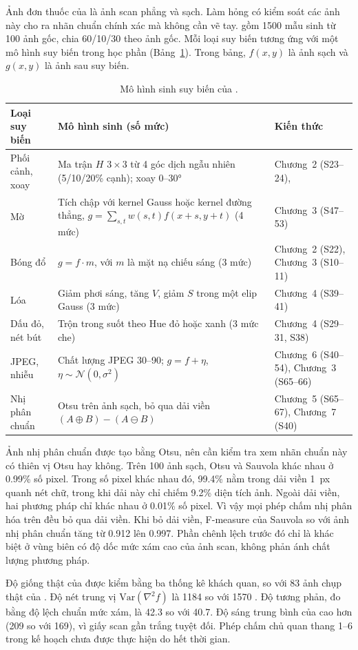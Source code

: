 Ảnh đơn thuốc của  là ảnh scan phẳng và sạch.
Làm hỏng có kiểm soát các ảnh này cho ra nhãn chuẩn chính xác mà không cần vẽ tay.
 gồm \num{1500} mẫu sinh từ 100 ảnh gốc, chia 60/10/30 theo ảnh gốc.
Mỗi loại suy biến tương ứng với một mô hình suy biến trong học phần (Bảng~\ref{tab:bo5}).
Trong bảng, $f(x,y)$ là ảnh sạch và $g(x,y)$ là ảnh sau suy biến.

\begin{table}[H]
\centering
\caption{Mô hình sinh suy biến của .}\label{tab:bo5}
\small
\begin{tabularx}{\linewidth}{lXl}
\toprule
\textbf{Loại suy biến} & \textbf{Mô hình sinh (số mức)} & \textbf{Kiến thức} \\
\midrule
Phối cảnh, xoay & Ma trận $H$ $3\times3$ từ 4 góc dịch ngẫu nhiên (5/10/20\% cạnh); xoay 0--30° & Chương~2 (S23--24), \cite{gonzalez2018dip} \\
Mờ & Tích chập với kernel Gauss hoặc kernel đường thẳng, $g=\sum_{s,t} w(s,t)f(x{+}s,y{+}t)$ (4 mức) & Chương~3 (S47--53) \\
Bóng đổ & $g=f\cdot m$, với $m$ là mặt nạ chiếu sáng (3 mức) & Chương~2 (S22), Chương~3 (S10--11) \\
Lóa & Giảm phơi sáng, tăng $V$, giảm $S$ trong một elip Gauss (3 mức) & Chương~4 (S39--41) \\
Dấu đỏ, nét bút & Trộn trong suốt theo Hue đỏ hoặc xanh (3 mức che) & Chương~4 (S29--31, S38) \\
JPEG, nhiễu & Chất lượng JPEG 30--90; $g=f+\eta$, $\eta\sim\mathcal N(0,\sigma^2)$ & Chương~6 (S40--54), Chương~3 (S65--66) \\
Nhị phân chuẩn & Otsu trên ảnh sạch, bỏ qua dải viền $(A\oplus B)-(A\ominus B)$ & Chương~5 (S65--67), Chương~7 (S40) \\
\bottomrule
\end{tabularx}
\end{table}

Ảnh nhị phân chuẩn được tạo bằng Otsu, nên cần kiểm tra xem nhãn chuẩn này có thiên vị Otsu hay không.
Trên 100 ảnh sạch, Otsu và Sauvola khác nhau ở \num{0.99}\% số pixel.
Trong số pixel khác nhau đó, \num{99.4}\% nằm trong dải viền 1~px quanh nét chữ, trong khi dải này chỉ chiếm \num{9.2}\% diện tích ảnh.
Ngoài dải viền, hai phương pháp chỉ khác nhau ở \num{0.01}\% số pixel.
Vì vậy mọi phép chấm nhị phân hóa trên  đều bỏ qua dải viền.
Khi bỏ dải viền, F-measure của Sauvola so với ảnh nhị phân chuẩn tăng từ \num{0.912} lên \num{0.997}.
Phần chênh lệch trước đó chỉ là khác biệt ở vùng biên có độ dốc mức xám cao của ảnh scan, không phản ánh chất lượng phương pháp.

Độ giống thật của  được kiểm bằng ba thống kê khách quan, so với 83 ảnh chụp thật của .
Độ nét trung vị $\mathrm{Var}(\nabla^2 f)$ là \num{1184} so với \num{1570} .
Độ tương phản, đo bằng độ lệch chuẩn mức xám, là \num{42.3} so với \num{40.7}.
Độ sáng trung bình của  cao hơn (\num{209} so với \num{169}), vì giấy scan gần trắng tuyệt đối.
Phép chấm chủ quan thang 1--6  trong kế hoạch chưa được thực hiện do hết thời gian.
